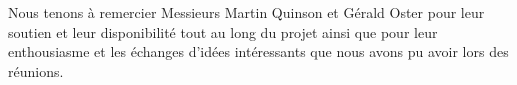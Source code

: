 
Nous tenons à remercier Messieurs Martin Quinson et Gérald Oster pour leur soutien et leur disponibilité tout au long du projet ainsi que pour leur enthousiasme et les échanges d'idées intéressants que nous avons pu avoir lors des réunions.
\bigskip \bigskip \bigskip

